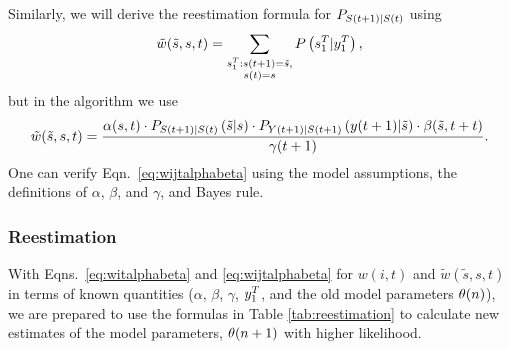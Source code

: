 Similarly, we will derive the reestimation formula for
$P_{{S}{(t+1)}|{S}{(t)}}$ using
\begin{equation}
  \label{eq:wijtFFE}
  {\tilde w}({\tilde s},s,t) = \sum_{\substack{s_{1}^{T}:{s}{(t+1)}={\tilde s},\\{s}{(t)}=s}}
  P \left(s_{1}^{T}|y_{1}^{T} \right),
\end{equation}
but in the algorithm we use
\begin{equation}
  \label{eq:wijtalphabeta}
  {\tilde w}({\tilde s},s,t) = \frac{ \alpha(s,t) \cdot P_{{S}{(t+1)}|{S}{(t)}}
    \left({\tilde s}|s \right)  \cdot P_{{Y}{(t+1)}|{S}{(t+1)}}
    \left({y}{(t+1)}|{\tilde s} \right) \cdot \beta({\tilde s},t+t) }
  {{\gamma}{(t+1)}}.
\end{equation}
One can verify Eqn.~\eqref{eq:wijtalphabeta} using the model
assumptions, the definitions of $\alpha$, $\beta$, and $\gamma$, and
Bayes rule.

\subsubsection{Reestimation}

With Eqns.~\eqref{eq:witalphabeta} and \eqref{eq:wijtalphabeta} for
$w(i,t)$ and ${\tilde w}({\tilde s},s,t)$ in terms of known quantities
($\alpha$, $\beta$, $\gamma$, $y_{1}^{T}$, and the old model
parameters ${\theta}{(n)}$), we are prepared to use the formulas
in Table \ref{tab:reestimation} to calculate new estimates of the
model parameters, ${\theta}{(n+1)}$ with higher likelihood.

